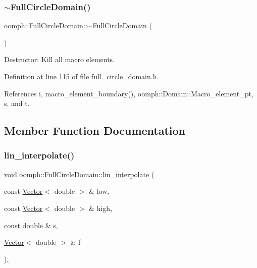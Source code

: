 \subsubsection{\texorpdfstring{$\sim$\+Full\+Circle\+Domain()}{~FullCircleDomain()}}
{\footnotesize\ttfamily oomph\+::\+Full\+Circle\+Domain\+::$\sim$\+Full\+Circle\+Domain (\begin{DoxyParamCaption}{ }\end{DoxyParamCaption})\hspace{0.3cm}{\ttfamily [inline]}}



Destructor\+: Kill all macro elements. 



Definition at line 115 of file full\+\_\+circle\+\_\+domain.\+h.



References i, macro\+\_\+element\+\_\+boundary(), oomph\+::\+Domain\+::\+Macro\+\_\+element\+\_\+pt, s, and t.



\subsection{Member Function Documentation}
\mbox{\label{classoomph_1_1FullCircleDomain_a77b7b1454eb0082545b1b63310cb978a}} 
\subsubsection{\texorpdfstring{lin\+\_\+interpolate()}{lin\_interpolate()}}
{\footnotesize\ttfamily void oomph\+::\+Full\+Circle\+Domain\+::lin\+\_\+interpolate (\begin{DoxyParamCaption}\item[{const \hyperlink{classoomph_1_1Vector}{Vector}$<$ double $>$ \&}]{low,  }\item[{const \hyperlink{classoomph_1_1Vector}{Vector}$<$ double $>$ \&}]{high,  }\item[{const double \&}]{s,  }\item[{\hyperlink{classoomph_1_1Vector}{Vector}$<$ double $>$ \&}]{f }\end{DoxyParamCaption})\hspace{0.3cm}{\ttfamily [inline]}, {\ttfamily [private]}}



